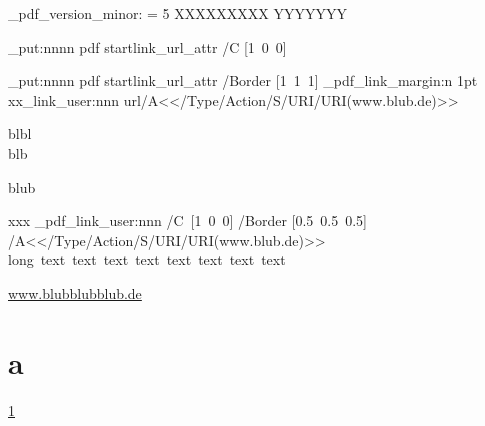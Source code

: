 \documentclass{article}
\begin{document}
\ExplSyntaxOn

\ifnum \driver_pdf_version_minor: = 5 XXXXXXXXX \else YYYYYYY\fi


\hook_put:nnnn
     { pdf }
     { startlink_url_attr }
     { /C }
     { [1~0~0] }

\hook_put:nnnn
       { pdf }
       { startlink_url_attr }
       { /Border }
       { [1~1~1] }
\driver_pdf_link_margin:n {1pt}
xx\pdf_link_user:nnn {url}{/A<</Type/Action/S/URI/URI(www.blub.de)>>}{blbl\\blb\par blub}

\par\bigskip
xxx
\driver_pdf_link_user:nnn
 {/C~[1~0~0]
 /Border [0.5~0.5~0.5]}
 {/A<</Type/Action/S/URI/URI(www.blub.de)>>}
 {long~text~text~text~text~text~text~text~text}

\url{www.blubblubblub.de}
\section{a}\label{a}
\ref{a}
\ExplSyntaxOff
{}
\end{document}
